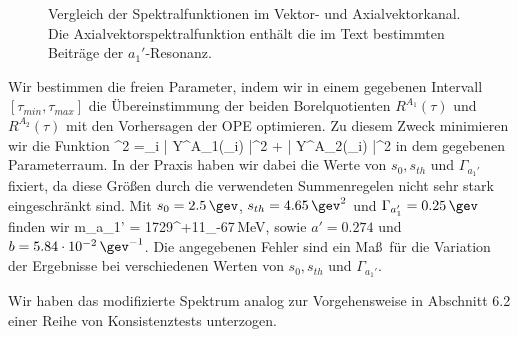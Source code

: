 \begin{figure}
\caption{Vergleich der Spektralfunktionen im Vektor- und 
Axialvektorkanal. Die Axialvektorspektralfunktion enth\"alt 
die im Text bestimmten Beitr\"age der $a_1'$-Resonanz.}
\vspace{7cm}
\end{figure} 
Wir bestimmen die freien Parameter, indem wir in einem gegebenen 
Intervall $[\tau_{min},\tau_{max}]$ die \"Ubereinstimmung der 
beiden Borelquotienten $R^{A_1}(\tau)$ und $R^{A_2}(\tau)$ mit 
den Vorhersagen der OPE optimieren. Zu diesem Zweck minimieren 
wir die Funktion
\be
\chi^2 =\sum_i \left| 
                    { \Delta Y^{A_1}(\tau_i) } \right|^2 +
               \left| 
	            { \Delta Y^{A_2}(\tau_i) } \right|^2 
\ee
in dem gegebenen Parameterraum. In der Praxis haben wir dabei die 
Werte von $s_0,s_{th}$ und $\Gamma_{a_1'}$ fixiert, da diese 
Gr\"o\ss en durch die verwendeten Summenregelen nicht sehr stark 
eingeschr\"ankt sind. Mit $s_0=2.5\,\gev$, $s_{th}=4.65\,\gev^2$
und $\Gamma_{a_1'}=0.25\,\gev$ finden wir
\be
\label{ma1p}
m_{a_1'} = 1729^{+11}_{-67}\,{\rm MeV},
\ee
sowie $a'=0.274$ und $b=5.84\cdot 10^{-2}\,\gev^{-1}$. Die angegebenen
Fehler sind ein Ma\ss\ f\"ur die Variation der Ergebnisse bei 
verschiedenen Werten von $s_0,s_{th}$ und $\Gamma_{a_1'}$. 

Wir haben das modifizierte Spektrum analog zur Vorgehensweise in
Abschnitt 6.2 einer Reihe von Konsistenztests unterzogen.
